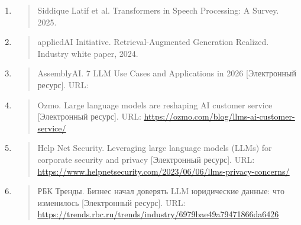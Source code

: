 \begin{enumerate}
  \begin{quote}
  Patrick Lewis et al. Retrieval-Augmented Generation for
  Knowledge-Intensive NLP Tasks. 2020.
  \end{quote}
\item
  \begin{quote}
  Siddique Latif et al. Transformers in Speech Processing: A Survey.
  2025.
  \end{quote}
\item
  \begin{quote}
  appliedAI Initiative. Retrieval-Augmented Generation Realized.
  Industry white paper, 2024.
  \end{quote}
\item
  \begin{quote}
  AssemblyAI. 7 LLM Use Cases and Applications in 2026 {[}Электронный
  ресурс{]}. URL:
  \end{quote}
\item
  \begin{quote}
  Ozmo. Large language models are reshaping AI customer service
  {[}Электронный ресурс{]}. URL:
  \href{https://ozmo.com/blog/llms-ai-customer-service/}{\ul{https://ozmo.com/blog/llms-ai-customer-service/}}
  \end{quote}
\item
  \begin{quote}
  Help Net Security. Leveraging large language models (LLMs) for
  corporate security and privacy {[}Электронный ресурс{]}. URL:
  \href{https://www.helpnetsecurity.com/2023/06/06/llms-privacy-concerns/}{\ul{https://www.helpnetsecurity.com/2023/06/06/llms-privacy-concerns/}}
  \end{quote}
\item
  \begin{quote}
  РБК Тренды. Бизнес начал доверять LLM юридические данные: что
  изменилось {[}Электронный ресурс{]}. URL:
  \href{https://trends.rbc.ru/trends/industry/6979bae49a79471866da6426?utm_source=chatgpt.com\#_blank}{\ul{https://trends.rbc.ru/trends/industry/6979bae49a79471866da6426}}
  \end{quote}
\end{enumerate}
